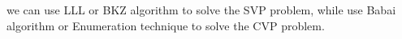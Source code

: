 we can use LLL or BKZ algorithm to solve the SVP problem, while use Babai algorithm or Enumeration technique to solve the CVP problem.

























